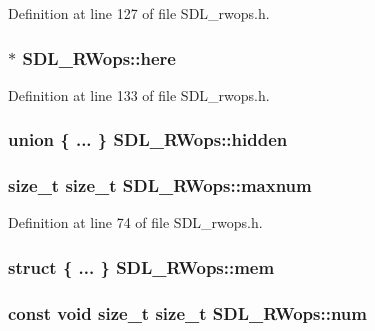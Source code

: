 Definition at line 127 of file S\-D\-L\-\_\-rwops.\-h.

\hypertarget{struct_s_d_l___r_wops_a6fc84601c17e347c6ef24c63a79deb57}{
\subsubsection[{here}]{$\ast$ S\-D\-L\-\_\-\-R\-Wops\-::here}}\label{struct_s_d_l___r_wops_a6fc84601c17e347c6ef24c63a79deb57}


Definition at line 133 of file S\-D\-L\-\_\-rwops.\-h.

\hypertarget{struct_s_d_l___r_wops_a2bf0dec0395f771b30c841fc7296164b}{
\subsubsection[{hidden}]{\setlength{\rightskip}{0pt plus 5cm}union \{ ... \}   S\-D\-L\-\_\-\-R\-Wops\-::hidden}}\label{struct_s_d_l___r_wops_a2bf0dec0395f771b30c841fc7296164b}
\hypertarget{struct_s_d_l___r_wops_a7786282ec28451085908f70048ee32c8}{
\subsubsection[{maxnum}]{ {\bf size\-\_\-t} {\bf size\-\_\-t} S\-D\-L\-\_\-\-R\-Wops\-::maxnum}}\label{struct_s_d_l___r_wops_a7786282ec28451085908f70048ee32c8}


Definition at line 74 of file S\-D\-L\-\_\-rwops.\-h.

\hypertarget{struct_s_d_l___r_wops_a850037e0fc608e382caa9e4cdddefdee}{
\subsubsection[{mem}]{\setlength{\rightskip}{0pt plus 5cm}struct \{ ... \}   S\-D\-L\-\_\-\-R\-Wops\-::mem}}\label{struct_s_d_l___r_wops_a850037e0fc608e382caa9e4cdddefdee}
\hypertarget{struct_s_d_l___r_wops_a630921d5c84cf48a4a10f9a75e1caa10}{
\subsubsection[{num}]{\setlength{\rightskip}{0pt plus 5cm}const {\bf void} {\bf size\-\_\-t} {\bf size\-\_\-t} S\-D\-L\-\_\-\-R\-Wops\-::num}}\label{struct_s_d_l___r_wops_a630921d5c84cf48a4a10f9a75e1caa10}


